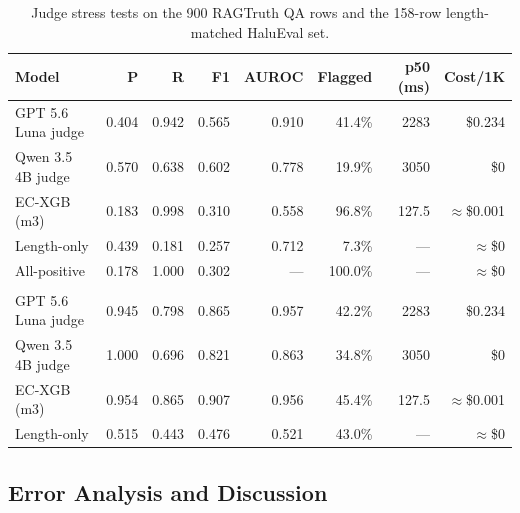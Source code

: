 \documentclass[a4paper,fleqn]{cas-sc}
\begin{document}
\begin{table}[pos=htbp]
  \centering
  \caption{Judge stress tests on the 900 RAGTruth QA rows and the 158-row length-matched HaluEval set.}
  \label{tab:judge}
  \setlength{\tabcolsep}{4pt}
  \begin{tabular}{lrrrrrrr}
    \toprule
    \textbf{Model}     & \textbf{P} & \textbf{R} & \textbf{F1} & \textbf{AUROC} & \textbf{Flagged} & \textbf{p50 (ms)} & \textbf{Cost/1K} \\
    \midrule
    GPT 5.6 Luna judge & 0.404      & 0.942      & 0.565       & 0.910          & 41.4\%           & 2283              & \$0.234          \\
    Qwen 3.5 4B judge  & 0.570      & 0.638      & 0.602       & 0.778          & 19.9\%           & 3050              & \$0              \\
    EC-XGB (m3)        & 0.183      & 0.998      & 0.310       & 0.558          & 96.8\%           & 127.5             & $\approx$\$0.001 \\
    Length-only        & 0.439      & 0.181      & 0.257       & 0.712          & 7.3\%            & ---               & $\approx$\$0 \\
    All-positive       & 0.178      & 1.000      & 0.302       & ---            & 100.0\%          & ---               & $\approx$\$0     \\
    \addlinespace
    \multicolumn{8}{l}{\emph{Length-matched HaluEval, 158 rows, 50\% positive}} \\
    GPT 5.6 Luna judge & 0.945      & 0.798      & 0.865       & 0.957          & 42.2\%           & 2283              & \$0.234          \\
    Qwen 3.5 4B judge  & 1.000      & 0.696      & 0.821       & 0.863          & 34.8\%           & 3050              & \$0              \\
    EC-XGB (m3)        & 0.954      & 0.865      & 0.907       & 0.956          & 45.4\%           & 127.5             & $\approx$\$0.001 \\
    Length-only        & 0.515      & 0.443      & 0.476       & 0.521          & 43.0\%           & ---               & $\approx$\$0     \\
    \bottomrule
  \end{tabular}
\end{table}

\subsection{Error Analysis and Discussion}
\end{document}
